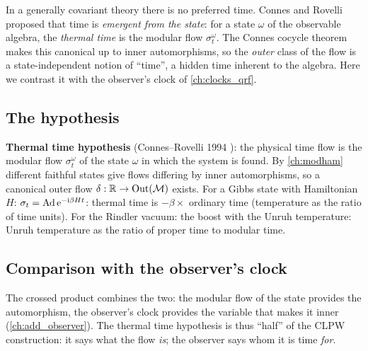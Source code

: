 \begin{physmotiv}
In a generally covariant theory there is no preferred time. Connes and Rovelli proposed that time is \emph{emergent from the state}: for a state $\omega$ of the observable algebra, the \emph{thermal time} is the modular flow $\sigma^\omega_t$. The Connes cocycle theorem makes this canonical up to inner automorphisms, so the \emph{outer} class of the flow is a state-independent notion of ``time'', a hidden time inherent to the algebra. Here we contrast it with the observer's clock of \cref{ch:clocks_qrf}.
\end{physmotiv}

\subsection{The hypothesis}

\textbf{Thermal time hypothesis} (Connes--Rovelli 1994 \cite{ConnesRovelli1994}): the physical time flow is the modular flow $\sigma^\omega_t$ of the state $\omega$ in which the system is found. By \cref{ch:modham} different faithful states give flows differing by inner automorphisms, so a canonical outer flow $\delta:\mathbb{R}\to\mathrm{Out}(\mathcal{M})$ exists. For a Gibbs state with Hamiltonian $H$: $\sigma_t=\operatorname{Ad}\mathrm{e}^{-\mathrm{i}\beta Ht}$: thermal time is $-\beta\times$ ordinary time (temperature as the ratio of time units). For the Rindler vacuum: the boost with the Unruh temperature: Unruh temperature as the ratio of proper time to modular time.

\subsection{Comparison with the observer's clock}

\begin{center}
\renewcommand{\arraystretch}{1.3}
\end{center}
The crossed product combines the two: the modular flow of the state provides the automorphism, the observer's clock provides the variable that makes it inner (\cref{ch:add_observer}). The thermal time hypothesis is thus ``half'' of the CLPW construction: it says what the flow \emph{is}; the observer says whom it is time \emph{for}.


